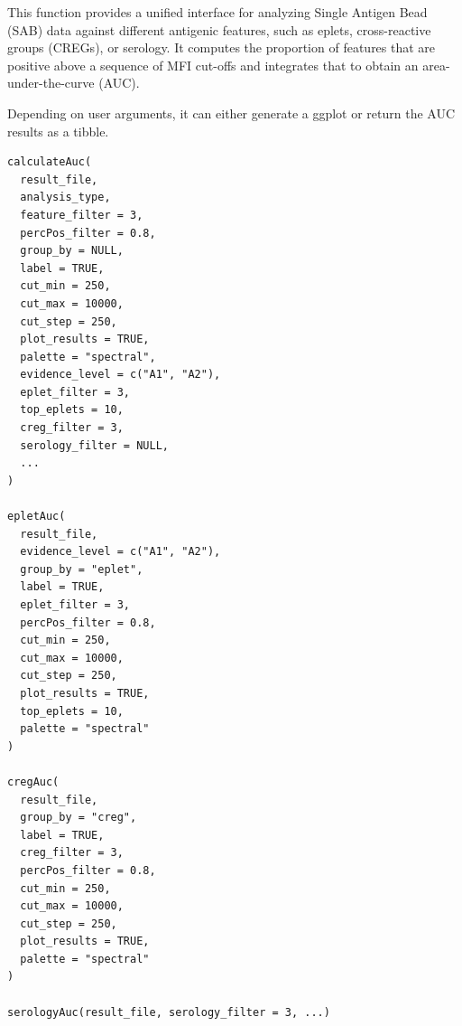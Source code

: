 \documentclass[letterpaper]{book}
\begin{document}
%
\begin{Description}
This function provides a unified interface for analyzing Single Antigen Bead
(SAB) data against different antigenic features, such as eplets,
cross-reactive groups (CREGs), or serology. It computes the proportion of features
that are positive above a sequence of MFI cut-offs and integrates that to
obtain an area-under-the-curve (AUC).

Depending on user arguments, it can either generate a ggplot or return
the AUC results as a tibble.
\end{Description}
%
\begin{Usage}
\begin{verbatim}
calculateAuc(
  result_file,
  analysis_type,
  feature_filter = 3,
  percPos_filter = 0.8,
  group_by = NULL,
  label = TRUE,
  cut_min = 250,
  cut_max = 10000,
  cut_step = 250,
  plot_results = TRUE,
  palette = "spectral",
  evidence_level = c("A1", "A2"),
  eplet_filter = 3,
  top_eplets = 10,
  creg_filter = 3,
  serology_filter = NULL,
  ...
)

epletAuc(
  result_file,
  evidence_level = c("A1", "A2"),
  group_by = "eplet",
  label = TRUE,
  eplet_filter = 3,
  percPos_filter = 0.8,
  cut_min = 250,
  cut_max = 10000,
  cut_step = 250,
  plot_results = TRUE,
  top_eplets = 10,
  palette = "spectral"
)

cregAuc(
  result_file,
  group_by = "creg",
  label = TRUE,
  creg_filter = 3,
  percPos_filter = 0.8,
  cut_min = 250,
  cut_max = 10000,
  cut_step = 250,
  plot_results = TRUE,
  palette = "spectral"
)

serologyAuc(result_file, serology_filter = 3, ...)
\end{verbatim}
\end{Usage}
%
\end{document}
